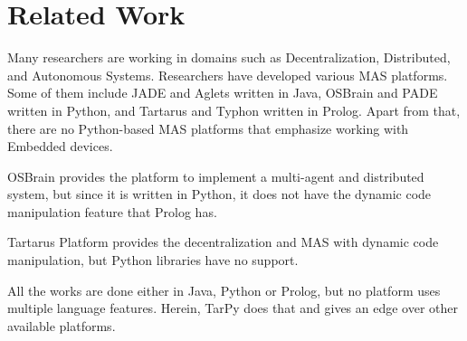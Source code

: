 \chapter{Related Work}


\bigbreak

\large 
Many researchers are working in domains such as Decentralization, Distributed, and Autonomous Systems. Researchers have developed various MAS platforms. Some of them include JADE\cite{10.1007/978-3-540-85058-8_15} and Aglets\cite{10.1145/295685.295882} written in Java, OSBrain and PADE\cite{pade} written in Python, and Tartarus and Typhon\cite{6524416} written in Prolog.  Apart from that, there are no Python-based MAS platforms that emphasize working with Embedded devices.
\par

\bigbreak
OSBrain\cite{OSBrain} provides the platform to implement a multi-agent and distributed system, but since it is written in Python, it does not have the dynamic code manipulation feature that Prolog has.
\par

\bigbreak
Tartarus Platform provides the decentralization and MAS with dynamic code manipulation, but Python libraries have no support.
\par

\bigbreak
All the works are done either in Java, Python or Prolog, but no platform uses multiple language features. Herein, TarPy does that and gives an edge over other available platforms.
\par
